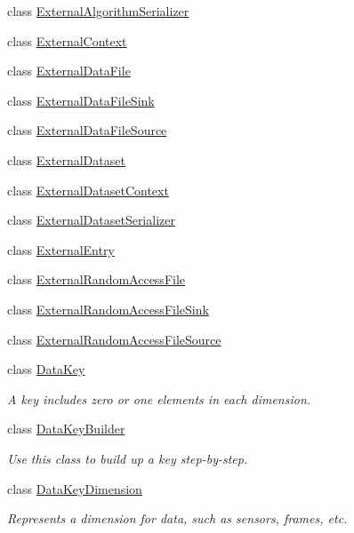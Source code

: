 \begin{DoxyCompactItemize}
\item 
class \hyperlink{classBUSBOY_1_1ExternalAlgorithmSerializer}{ExternalAlgorithmSerializer}
\item 
class \hyperlink{classBUSBOY_1_1ExternalContext}{ExternalContext}
\item 
class \hyperlink{classBUSBOY_1_1ExternalDataFile}{ExternalDataFile}
\item 
class \hyperlink{classBUSBOY_1_1ExternalDataFileSink}{ExternalDataFileSink}
\item 
class \hyperlink{classBUSBOY_1_1ExternalDataFileSource}{ExternalDataFileSource}
\item 
class \hyperlink{classBUSBOY_1_1ExternalDataset}{ExternalDataset}
\item 
class \hyperlink{classBUSBOY_1_1ExternalDatasetContext}{ExternalDatasetContext}
\item 
class \hyperlink{classBUSBOY_1_1ExternalDatasetSerializer}{ExternalDatasetSerializer}
\item 
class \hyperlink{classBUSBOY_1_1ExternalEntry}{ExternalEntry}
\item 
class \hyperlink{classBUSBOY_1_1ExternalRandomAccessFile}{ExternalRandomAccessFile}
\item 
class \hyperlink{classBUSBOY_1_1ExternalRandomAccessFileSink}{ExternalRandomAccessFileSink}
\item 
class \hyperlink{classBUSBOY_1_1ExternalRandomAccessFileSource}{ExternalRandomAccessFileSource}
\item 
class \hyperlink{classBUSBOY_1_1DataKey}{DataKey}
\begin{DoxyCompactList}\small\item\em A key includes zero or one elements in each dimension. \item\end{DoxyCompactList}\item 
class \hyperlink{classBUSBOY_1_1DataKeyBuilder}{DataKeyBuilder}
\begin{DoxyCompactList}\small\item\em Use this class to build up a key step-\/by-\/step. \item\end{DoxyCompactList}\item 
class \hyperlink{classBUSBOY_1_1DataKeyDimension}{DataKeyDimension}
\begin{DoxyCompactList}\small\item\em Represents a dimension for data, such as sensors, frames, etc. \item\end{DoxyCompactList}\item 

\end{DoxyCompactItemize}
